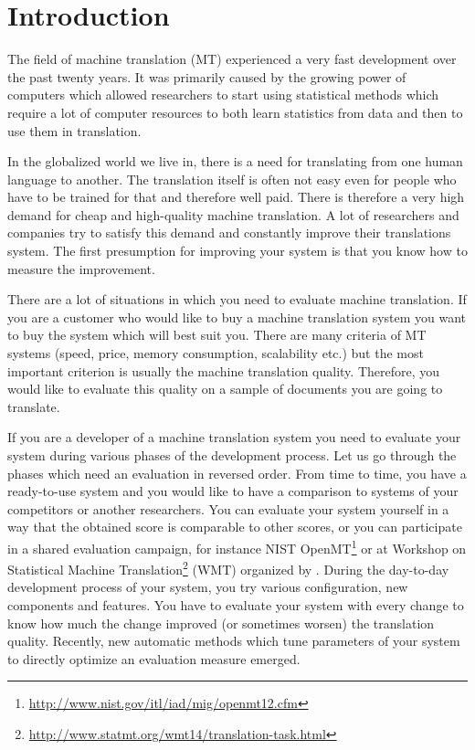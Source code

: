 \chapter{Introduction}

The field of machine translation (MT) experienced a very fast development over
the past twenty years. It was primarily caused by the growing power of
computers which allowed researchers to start using statistical methods which
require a lot of computer resources to both learn statistics from data and then
to use them in translation.

In the globalized world we live in, there is a need for translating from one
human language to another. The translation itself is often not easy even for
people who have to be trained for that and therefore well paid. There is
therefore a very high demand for cheap and high-quality machine translation. A
lot of researchers and companies try to satisfy this demand and constantly
improve their translations system. The first presumption for improving your
system is that you know how to measure the improvement.

There are a lot of situations in which you need to evaluate machine
translation. If you are a customer who would like to buy a machine translation
system you want to buy the system which will best suit you. There are many
criteria of MT systems (speed, price, memory consumption, scalability etc.) but
the most important criterion is usually the machine translation quality.
Therefore, you would like to evaluate this quality on a sample of documents you
are going to translate.

If you are a developer of a machine translation system you need to evaluate
your system during various phases of the development process. Let us go through
the phases which need an evaluation in reversed order. From time to time, you
have a ready-to-use system and you would like to have a comparison to systems
of your competitors or another researchers. You can evaluate your system
yourself in a way that the obtained score is comparable to other scores, or you
can participate in a shared evaluation campaign, for instance NIST
OpenMT\footnote{\url{http://www.nist.gov/itl/iad/mig/openmt12.cfm}} or at
Workshop on Statistical Machine
Translation\footnote{\url{http://www.statmt.org/wmt14/translation-task.html}}
(WMT) organized by .  During the day-to-day
development process of your system, you try various configuration, new
components and features. You have to evaluate your system with every change to
know how much the change improved (or sometimes worsen) the translation
quality. Recently, new automatic methods which tune parameters of your system
to directly optimize an evaluation measure emerged.


